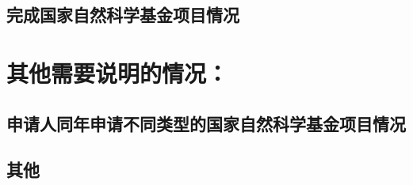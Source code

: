 \documentclass[UTF8,zihao=-4]{ctexart} %
\begin{document}
  \subsection[（对申请人负责的前一个已资助期满的科学基金项目（项目名称及批准号）完成情况、后续研究进展及与本申请项目的关系加以详细说明。另附该项目的研究工作总结摘要（限500字）和相关成果详细目录）。]{完成国家自然科学基金项目情况}
  \section{其他需要说明的情况：}
  \subsection[（列明同年申请的其他项目的项目类型、项目名称信息，并说明与本项目之间的区别与联系；已收到自然科学基金委不予受理或不予资助决定的，无需列出）。]{申请人同年申请不同类型的国家自然科学基金项目情况}
  \subsection[具有高级专业技术职务（职称）的申请人或者主要参与者是否存在同年申请或者参与申请国家自然科学基金项目的单位不一致的情况；如存在上述情况，列明所涉及人员的姓名，申请或参与申请的其他项目的项目类型、项目名称、单位名称、上述人员在该项目中是申请人还是参与者，并说明单位不一致原因。]{}
  \subsection[具有高级专业技术职务（职称）的申请人或者主要参与者是否存在与正在承担的国家自然科学基金项目的单位不一致的情况；如存在上述情况，列明所涉及人员的姓名，正在承担项目的批准号、项目类型、项目名称、单位名称、起止年月，并说明单位不一致原因。]{}
  \subsection[申请人和主要参与者同年以不同专业技术职务（职称）申请或参与申请科学基金项目的情况（应详细说明原因）。]{}
  \subsection[申请人在撰写本申请书时使用生成式人工智能的情况，请详细说明申请书中使用的位置和内容。]{}
  \subsection[（包括但不限于使用以他人名义申报过的申请书；如有，请详细说明）。]{其他}
  \nsfcWordCount
\end{document}
